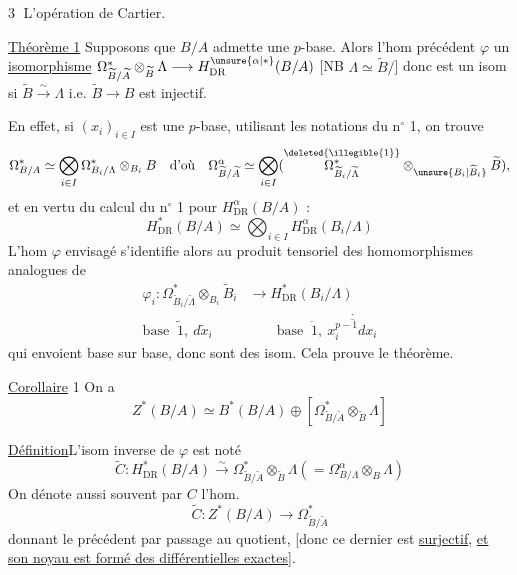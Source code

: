 \textcircled{3} L'opération de Cartier.

\uline{Théorème 1} Supposons que $B/A$ admette une $p$-base. Alors l'hom précédent $\varphi$  un \uline{isomorphisme} $\Omega^*_{\widetilde B/\widetilde A}\otimes_{\widetilde B}\Lambda\longrightarrow H^{\unsure{\alpha|*}}_{\mathrm{DR}}(B/A)$ [NB $\Lambda\simeq\widetilde B/$] donc est un isom si $\widetilde B\xrightarrow{\sim}\Lambda$ i.e. $\widetilde B\longrightarrow B$ est injectif.

En effet, si $(x_i)_{i\in I}$ est une $p$-base, utilisant les notations du n$^\circ$ 1, on trouve 
\[
 \Omega^*_{B/A}\simeq\bigotimes_{i\in I}\Omega^*_{B_i/\Lambda}\otimes_{B_i}B
 \quad\text{d'où}\quad
 \Omega^\alpha_{\widetilde B/\widetilde A}\simeq\bigotimes_{i\in I}
 (\overset{\deleted{\illegible{1}}}{\Omega^*_{\widetilde B_i/\widetilde\Lambda}}\otimes_{\unsure{B_i|\widetilde B_i}}\widetilde B),
\]
et en vertu du calcul du n$^\circ$ 1 pour $H^\alpha_{\mathrm{DR}}(B/A)$ :
\[
 H^*_{\mathrm{DR}}(B/A)\simeq\bigotimes_{i\in I}H^\alpha_{\mathrm{DR}}(B_i/\Lambda)
\]
L'hom $\varphi$ envisagé s'identifie alors au produit tensoriel des homomorphismes analogues  de
\[
 \begin{aligned}
 \varphi_i:\Omega^*_{\widetilde B_i/\widetilde\Lambda}\otimes_{B_i}\widetilde B_i
 &\longrightarrow H^*_{\mathrm{DR}}(B_i/\Lambda)\\
 \text{base }\ \widetilde 1,\ d\widetilde x_i&\qquad
 \text{base }\ \dot{1},\ \overset{\cdot}{\overline{x_i^{p-1}dx_i}}
 \end{aligned}
\]
qui envoient base sur base, donc sont des isom. Cela prouve le théorème.

\uline{Corollaire} 1  On a
\[
 Z^*(B/A)\simeq B^*(B/A)\oplus[\Omega^*_{\widetilde B/\widetilde A}\otimes_{\widetilde B}\Lambda]
\]

\uline{Définition}\quad L'isom inverse de $\varphi$ est noté
\[
 \boxed{\widetilde C:H^*_{\mathrm{DR}}(B/A)\xrightarrow{\sim}
 \Omega^*_{\widetilde B/\widetilde A}\otimes_{\widetilde B}\Lambda}
 \boxed{(=\Omega^\alpha_{B/\Lambda}\otimes_B\Lambda)}
\]
On dénote aussi souvent par $C$ l'hom.
\[
 \widetilde C:Z^*(B/A)\longrightarrow\Omega^*_{\widetilde B/\widetilde A}
\]
donnant le précédent par passage au quotient, [donc ce dernier est \uline{surjectif}, \uline{et son noyau est formé des différentielles exactes}].

